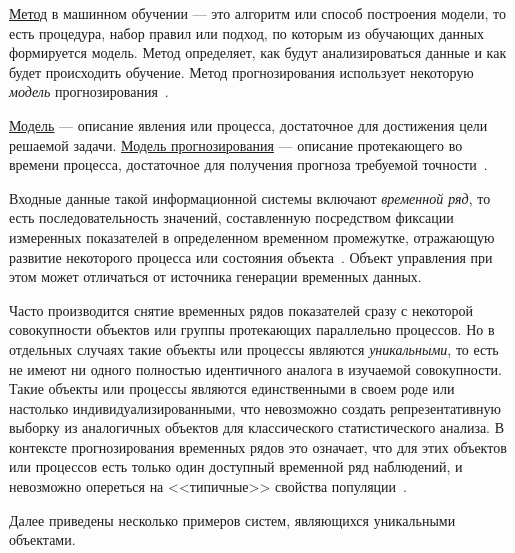\ul{Метод} в машинном обучении --- это алгоритм или способ построения модели, то есть процедура, набор правил или подход, по которым из обучающих данных формируется модель. Метод определяет, как будут анализироваться данные и как будет происходить обучение. Метод прогнозирования использует некоторую \textit{модель} прогнозирования~\cite{SovetovYakovlevModeling2021}.

\ul{Модель} --- описание явления или процесса, достаточное для достижения цели решаемой задачи. \ul{Модель прогнозирования} --- описание протекающего во времени процесса, достаточное для получения прогноза требуемой точности~\cite{SovetovYakovlevModeling2021}.

Входные данные такой информационной системы включают \textit{временной ряд}, то есть последовательность значений, составленную посредством фиксации измеренных показателей в определенном временном промежутке, отражающую развитие некоторого процесса или состояния объекта~\cite{BrockwellDavis2016, OrlovEconometricsTS, NaumovTSForecasting}. Объект управления при этом может отличаться от источника генерации временных данных.

Часто производится снятие временных рядов показателей сразу с некоторой совокупности объектов или группы протекающих параллельно процессов. Но в отдельных случаях такие объекты или процессы являются \textit{уникальными}, то есть не имеют ни одного полностью идентичного аналога в изучаемой совокупности. Такие объекты или процессы являются единственными в своем роде или настолько индивидуализированными, что невозможно создать репрезентативную выборку из аналогичных объектов для классического статистического анализа. В контексте прогнозирования временных рядов это означает, что для этих объектов или процессов есть только один доступный временной ряд наблюдений, и невозможно опереться на <<типичные>> свойства популяции~\cite{GolovkoYamen2014SmallSample, PavlovHydrologySeries2024}.



Далее приведены несколько примеров систем, являющихся уникальными объектами.


